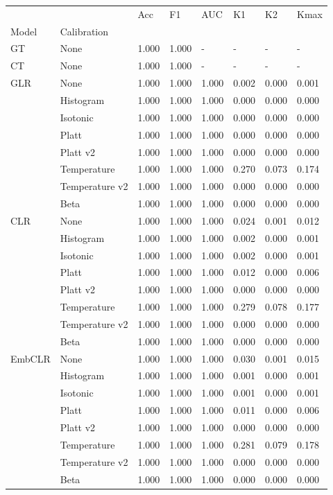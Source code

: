 \begin{tabular}{llllllll}
\toprule
 &  & Acc & F1 & AUC & K1 & K2 & Kmax \\
Model & Calibration &  &  &  &  &  &  \\
\midrule
GT & None & 1.000 & 1.000 & - & - & - & - \\
\cline{1-8}
CT & None & 1.000 & 1.000 & - & - & - & - \\
\cline{1-8}
\multirow[t]{8}{*}{GLR} & None & 1.000 & 1.000 & 1.000 & 0.002 & 0.000 & 0.001 \\
 & Histogram & 1.000 & 1.000 & 1.000 & 0.000 & 0.000 & 0.000 \\
 & Isotonic & 1.000 & 1.000 & 1.000 & 0.000 & 0.000 & 0.000 \\
 & Platt & 1.000 & 1.000 & 1.000 & 0.000 & 0.000 & 0.000 \\
 & Platt v2 & 1.000 & 1.000 & 1.000 & 0.000 & 0.000 & 0.000 \\
 & Temperature & 1.000 & 1.000 & 1.000 & 0.270 & 0.073 & 0.174 \\
 & Temperature v2 & 1.000 & 1.000 & 1.000 & 0.000 & 0.000 & 0.000 \\
 & Beta & 1.000 & 1.000 & 1.000 & 0.000 & 0.000 & 0.000 \\
\cline{1-8}
\multirow[t]{8}{*}{CLR} & None & 1.000 & 1.000 & 1.000 & 0.024 & 0.001 & 0.012 \\
 & Histogram & 1.000 & 1.000 & 1.000 & 0.002 & 0.000 & 0.001 \\
 & Isotonic & 1.000 & 1.000 & 1.000 & 0.002 & 0.000 & 0.001 \\
 & Platt & 1.000 & 1.000 & 1.000 & 0.012 & 0.000 & 0.006 \\
 & Platt v2 & 1.000 & 1.000 & 1.000 & 0.000 & 0.000 & 0.000 \\
 & Temperature & 1.000 & 1.000 & 1.000 & 0.279 & 0.078 & 0.177 \\
 & Temperature v2 & 1.000 & 1.000 & 1.000 & 0.000 & 0.000 & 0.000 \\
 & Beta & 1.000 & 1.000 & 1.000 & 0.000 & 0.000 & 0.000 \\
\cline{1-8}
\multirow[t]{8}{*}{EmbCLR} & None & 1.000 & 1.000 & 1.000 & 0.030 & 0.001 & 0.015 \\
 & Histogram & 1.000 & 1.000 & 1.000 & 0.001 & 0.000 & 0.001 \\
 & Isotonic & 1.000 & 1.000 & 1.000 & 0.001 & 0.000 & 0.001 \\
 & Platt & 1.000 & 1.000 & 1.000 & 0.011 & 0.000 & 0.006 \\
 & Platt v2 & 1.000 & 1.000 & 1.000 & 0.000 & 0.000 & 0.000 \\
 & Temperature & 1.000 & 1.000 & 1.000 & 0.281 & 0.079 & 0.178 \\
 & Temperature v2 & 1.000 & 1.000 & 1.000 & 0.000 & 0.000 & 0.000 \\
 & Beta & 1.000 & 1.000 & 1.000 & 0.000 & 0.000 & 0.000 \\
\cline{1-8}
\bottomrule
\end{tabular}
